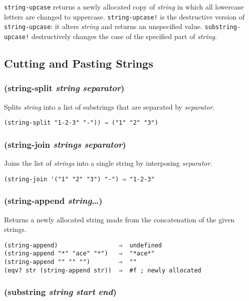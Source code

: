 \documentclass{article}
\begin{document}
\verb|string-upcase| returns a newly allocated copy of \emph{string} in which all lowercase
letters are changed to uppercase. \verb|string-upcase!| is the destructive version of
\verb|string-upcase|: it alters \emph{string} and returns an unspecified value.
\verb|substring-upcase!| destructively changes the case of the specified part of
\emph{string}.

\subsection{Cutting and Pasting Strings}\label{sec:cutting-and-pasting-strings}

\subsubsection{(string-split \emph{string} \emph{separator})}

Splits \emph{string} into a list of substrings that are separated by \emph{separator}.

\begin{verbatim}
(string-split "1-2-3" "-")) ⇒ ("1" "2" "3")
\end{verbatim}

\subsubsection{(string-join \emph{strings} \emph{separator})}

Joins the list of \emph{strings} into a single string by interposing \emph{separator}.

\begin{verbatim}
(string-join '("1" "2" "3") "-") ⇒ "1-2-3"
\end{verbatim}

\subsubsection{(string-append \emph{string}\ldots{})}

Returns a newly allocated string made from the concatenation of the given strings.

\begin{verbatim}
(string-append)                 ⇒  undefined
(string-append "*" "ace" "*")   ⇒  "*ace*"
(string-append "" "" "")        ⇒  ""
(eqv? str (string-append str))  ⇒  #f ; newly allocated
\end{verbatim}

\subsubsection{(substring \emph{string} \emph{start} \emph{end})}
\end{document}
